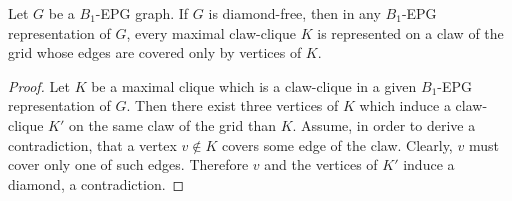 \documentclass{dmgt}
\begin{document}
%
 

\begin{lemma}\label{lem:b1epgDiamondFree}
Let $G$ be a $B_1$-EPG graph. If $G$ is diamond-free, then in any $B_1$-EPG representation of $G$,  every maximal claw-clique $K$ is represented on a claw of the grid whose edges are covered only by vertices of $K$.
\end{lemma}

\begin{proof}Let $K$ be a maximal clique which is a claw-clique in a given $B_1$-EPG representation of $G$. Then there exist three vertices of $K$ which induce a claw-clique $K'$ on
the same claw of the grid than $K$. Assume, in order to derive a contradiction, that a vertex $v\notin K$ covers some edge of the claw. Clearly, $v$ must  cover
only one of such edges. Therefore $v$ and the vertices of $K'$ induce a diamond, a contradiction. 
\end{proof}


\end{document}
